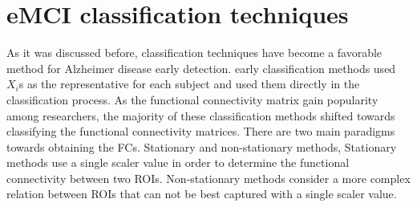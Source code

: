 \documentclass[journal]{IEEEtran}
\begin{document}
	
	
	
	
	
	
	
	\section{eMCI classification techniques}
	
	As it was discussed before, classification techniques have become a favorable method for Alzheimer disease early detection. early classification methods used $X_{i}$s as the representative for each subject and used them directly in the classification process. 
	As the functional connectivity matrix gain popularity among researchers, the majority of these classification methods shifted towards classifying the functional connectivity matrices. There are two main paradigms towards obtaining the FCs. Stationary and non-stationary methods, Stationary methods use a single scaler value in order to determine the functional connectivity between two ROIs. Non-stationary methods consider a more complex relation between ROIs that can not be best captured with a single scaler value. 
	
\end{document}
